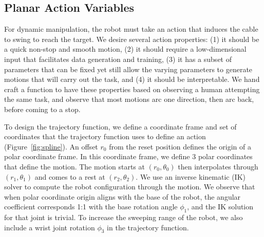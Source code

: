 \documentclass[letterpaper, 10 pt, conference]{ieeeconf}  %
\newcommand{\ba}{\mathbf{a}}
\newcommand{\remark}[3]{{\color{#2}[#1: #3]}}
\newcommand{\jonathan}[1]{\remark{Jonathan}{cyan}{#1}}
\begin{document}
\subsection{Planar Action Variables}\label{ssec:action}
For dynamic manipulation, the robot must take an action that induces the cable to swing to reach the target.  We desire several action properties: (1) it should be a quick non-stop and smooth motion, (2) it should require a low-dimensional input that facilitates data generation and training, (3) it has a subset of parameters that can be fixed yet still allow the varying parameters to generate motions that will carry out the task, and (4) it should be interpretable.  We hand craft a function to have these properties based on observing a human attempting the same task, and observe that most motions arc one direction, then arc back, before coming to a stop. 


To design the trajectory function, we define a coordinate frame and set of coordinates that the trajectory function uses to define an action (Figure~\ref{fig:spline}).
An offset $r_0$ from the reset position defines the origin of a polar coordinate frame.  %
In this coordinate frame, we define 3 polar coordinates that define the motion.  The motion starts at $(r_0, \theta_0)$ then interpolates through $(r_1, \theta_1)$ and comes to a rest at $(r_2, \theta_2)$.
We use an inverse kinematic (IK) solver to compute the robot configuration through the motion.  We observe that when polar coordinate origin aligns with the base of the robot, the angular coefficient corresponds 1:1 with the base rotation angle $\phi_1$, and the IK solution for that joint is trivial.
To increase the sweeping range of the robot, we also include a wrist joint rotation $\phi_3$ in the trajectory function.
\end{document}
